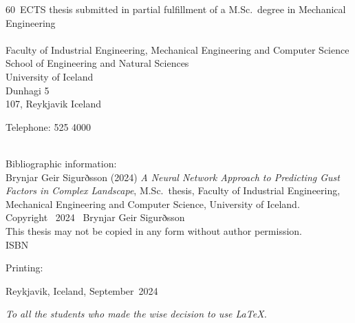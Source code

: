 \documentclass[a4paper,12pt,twoside,BCOR=10mm]{scrbook}
\def\thesisyear{2024}       					%
\def\thesismonth{September}					%
\def\thesisauthor{Brynjar Geir Sigurðsson}				%
\def\thesistitle{A Neural Network Approach to Predicting Gust Factors in Complex Landscape} %
\def\thesiscredits{60} 						%
\def\thesissubject{Mechanical Engineering}
\def\thesiskind{M.Sc.}					%
\def\thesisschool{School of Engineering and {Natural Sciences}}		%
\def\thesisfaculty{Industrial Engineering, Mechanical Engineering and Computer Science}%
\def\thesisaddress{Dunhagi 5}			        %
\def\thesispostalcode{107}			                %
\def\thesistelephone{525 4000}					%
\def\thesisISBN{}           					%
\def\thesisprinting{}						%
\def\thesislicense{This thesis may not be copied in any form without author permission.} %
\newcommand{\removelinebreaks}[1]{%
  \begingroup\def\\{}#1\endgroup}
\begin{document}
\begin{titlepage}
    
  \thesiscredits ~ECTS thesis submitted in partial fulfillment of a \thesiskind{}~degree in \thesissubject
\\ \\
  Faculty of \thesisfaculty \\
  \thesisschool \\
  University of Iceland \\
  \thesisaddress \\ 
  \thesispostalcode, Reykjavik 
  Iceland

  Telephone: \thesistelephone \\ \\ 
  \vspace*{\lineskip}

  Bibliographic information: \\
  \thesisauthor{} (\thesisyear{}) \emph{\removelinebreaks{\thesistitle{}}}, \thesiskind{}~thesis, Faculty of \thesisfaculty, University of Iceland.\\

  Copyright \textcopyright~\thesisyear~ \thesisauthor \\
  \thesislicense{}\\

  \ifx\thesisISBN\empty %
  \else
  ISBN~\thesisISBN
  \fi
  
  \ifx\thesisprinting\empty %
  \else
  Printing: \thesisprinting \\
  \fi


  Reykjavik, Iceland, \thesismonth~\thesisyear \\
  

  \newpage %

  \thispagestyle{empty} \mbox{}

  \vfill

  \begin{center}
    \textit{
      To all the students who made the wise decision to use \LaTeX. %
    }
  \end{center} \vspace*{5cm}

  \vfill 


\end{titlepage}
\end{document}
